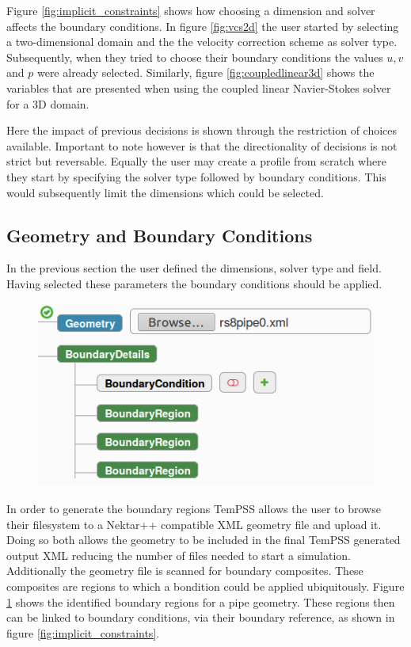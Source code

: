 \documentclass[11pt, a4paper]{report}
\begin{document}
Figure \ref{fig:implicit_constraints} shows how choosing a dimension and solver affects the boundary conditions. In figure \ref{fig:vcs2d} the user started by selecting a two-dimensional domain and the the velocity correction scheme as solver type. Subsequently, when they tried to choose their boundary conditions the values $u, v$ and $p$ were already selected. Similarly, figure \ref{fig:coupledlinear3d} shows the variables that are presented when using the coupled linear Navier-Stokes solver for a 3D domain.

Here the impact of previous decisions is shown through the restriction of choices available. Important to note however  is that the directionality of decisions is not strict but reversable. Equally the user may create a profile from scratch where they start by specifying the solver type followed by boundary conditions. This would subsequently limit the dimensions which could be selected.

\subsection{Geometry and Boundary Conditions}
In the previous section the user defined the dimensions, solver type and field. Having selected these parameters the boundary conditions should be applied.

\begin{figure}[htb!]
 \centering
 \includegraphics[width=.55\linewidth,  clip=true, trim = 0cm 0cm 0cm 0cm]{geometry_upload}
 \label{fig:geometry_upload}
\end{figure}

In order to generate the boundary regions TemPSS allows the user to browse their filesystem to a Nektar++ compatible XML geometry file and upload it. Doing so both allows the geometry to be included in the final TemPSS generated output XML reducing the number of files needed to start a simulation. Additionally the geometry file is scanned for boundary composites. These composites are regions to which a bondition could be applied ubiquitously. Figure \ref{fig:geometry_upload} shows the identified boundary regions for a pipe geometry. These regions then can be linked to boundary conditions, via their boundary reference, as shown in figure \ref{fig:implicit_constraints}.
\end{document}
